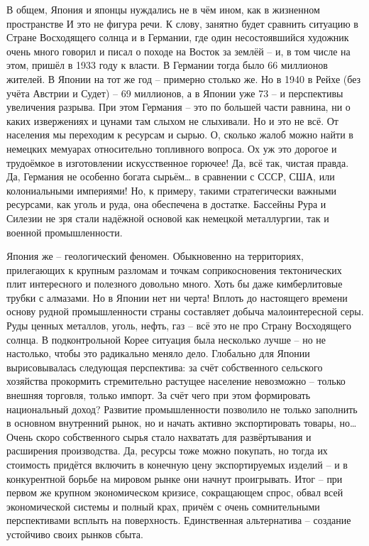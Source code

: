 В общем, Япония и японцы нуждались не в чём ином, как в жизненном пространстве И это не фигура речи. К слову, занятно будет сравнить ситуацию в Стране Восходящего солнца и в Германии, где один несостоявшийся художник очень много говорил и писал о походе на Восток за землёй – и, в том числе на этом, пришёл в 1933 году к власти. В Германии тогда было 66 миллионов жителей. В Японии на тот же год – примерно столько же. Но в 1940 в Рейхе (без учёта Австрии и Судет) – 69 миллионов, а в Японии уже 73 – и перспективы увеличения разрыва. При этом Германия – это по большей части равнина, ни о каких извержениях и цунами там слыхом не слыхивали. Но и это не всё. От населения мы переходим к ресурсам и сырью. О, сколько жалоб можно найти в немецких мемуарах относительно топливного вопроса. Ох уж это дорогое и трудоёмкое в изготовлении искусственное горючее! Да, всё так, чистая правда. Да, Германия не особенно богата сырьём… в сравнении с СССР, США, или колониальными империями! Но, к примеру, такими стратегически важными ресурсами, как уголь и руда, она обеспечена в достатке. Бассейны Рура и Силезии не зря стали надёжной основой как немецкой металлургии, так и военной промышленности.

Япония же – геологический феномен. Обыкновенно на территориях, прилегающих к крупным разломам и точкам соприкосновения тектонических плит интересного и полезного довольно много. Хоть бы даже кимберлитовые трубки с алмазами. Но в Японии нет ни черта! Вплоть до настоящего времени основу рудной промышленности страны составляет добыча малоинтересной серы. Руды ценных металлов, уголь, нефть, газ – всё это не про Страну Восходящего солнца. В подконтрольной Корее ситуация была несколько лучше – но не настолько, чтобы это радикально меняло дело. Глобально для Японии вырисовывалась следующая перспектива: за счёт собственного сельского хозяйства прокормить стремительно растущее население невозможно – только внешняя торговля, только импорт. За счёт чего при этом формировать национальный доход? Развитие промышленности позволило не только заполнить в основном внутренний рынок, но и начать активно экспортировать товары, но… Очень скоро собственного сырья стало нахватать для развёртывания и расширения производства. Да, ресурсы тоже можно покупать, но тогда их стоимость придётся включить в конечную цену экспортируемых изделий – и в конкурентной борьбе на мировом рынке они начнут проигрывать. Итог – при первом же крупном экономическом кризисе, сокращающем спрос, обвал всей экономической системы и полный крах, причём с очень сомнительными перспективами всплыть на поверхность. Единственная альтернатива – создание устойчиво своих рынков сбыта.


